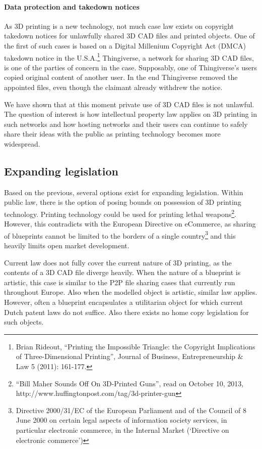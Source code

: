 \paragraph{Data protection and takedown notices}
As 3D printing is a new technology, not much case law exists on copyright 
takedown notices for unlawfully shared 3D CAD files and printed objects.
One of the first of such cases is based on a Digital Millenium Copyright Act 
(DMCA) takedown notice in the U.S.A.\footnote{Brian Rideout, ``Printing the Impossible Triangle: the Copyright Implications of Three-Dimensional Printing'', Journal of Business, Entrepreneurship \& Law 5 (2011): 161-177.}
Thingiverse, a network for sharing 3D CAD files, is one of the parties of 
concern in the case.
Supposably, one of Thingiverse's users copied original content of another user.
In the end Thingiverse removed the appointed files, even though the claimant
already withdrew the notice.

We have shown that at this moment private use of 3D CAD files is not unlawful.
The question of interest is how intellectual property law applies on 3D printing
 in such networks and how hosting networks and their users can continue to 
 safely share their ideas with the public as printing technology becomes more 
widespread.

\subsection{Expanding legislation}
Based on the previous, several options exist for expanding legislation.
Within public law, there is the option of posing bounds on possession of 3D printing technology.
Printing technology could be used for printing lethal weapons\footnote{``Bill Maher Sounds Off On 3D-Printed Guns'', read on October 10, 2013, http://www.huffingtonpost.com/tag/3d-printer-gun}.
However, this contradicts with the European Directive on eCommerce, as sharing of blueprints cannot be limited to the borders of a single country\footnote{Directive 2000/31/EC of the European Parliament and of the Council of 8 June 2000 on certain legal aspects of information society services, in particular electronic commerce, in the Internal Market (`Directive on electronic commerce')} and this heavily limits open market development.

Current law does not fully cover the current nature of 3D printing, as the contents of a 3D CAD file diverge heavily.
When the nature of a blueprint is artistic, this case is similar to the P2P file sharing cases that currently run throughout Europe.
Also when the modelled object is artistic, similar law applies.
However, often a blueprint encapsulates a utilitarian object for which current Dutch patent laws do not suffice.
Also there exists no home copy legislation for such objects.


